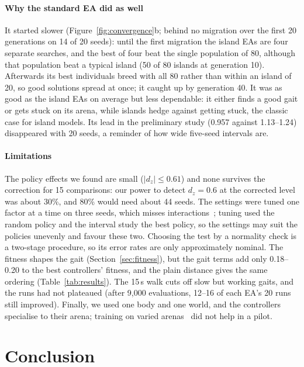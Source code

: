 \documentclass[sigconf]{acmart}
\begin{document}
\paragraph{Why the standard EA did as well} It started slower
(Figure~\ref{fig:convergence}b; behind no migration over the first 20
generations on 14 of 20 seeds): until the first migration the island EAs are
four separate searches, and the best of four beat the single population of
80, although that population beat a typical island (50 of 80 islands at
generation 10). Afterwards its best
individuals breed with all 80 rather than within an island of 20, so good
solutions spread at once; it caught up by generation 40. It was as good as
the island EAs on average but less dependable: it either finds a good gait or
gets stuck on its arena, while islands hedge against getting stuck, the
classic case for island models. Its lead in the preliminary study (0.957
against 1.13--1.24) disappeared with 20 seeds, a reminder of how wide
five-seed intervals are.

\paragraph{Limitations} The policy effects we found are small ($|d_z| \leq
0.61$) and none survives the correction for 15 comparisons: our power to
detect $d_z = 0.6$ at the corrected level was about 30\%, and 80\% would need
about 44 seeds. The settings were tuned one factor at
a time on three seeds, which misses interactions~\cite{eiben2011parameter};
tuning used the random policy and the interval study the best policy, so the
settings may suit the policies unevenly and favour these two. Choosing the test by a normality
check is a two-stage procedure, so its error rates are only approximately
nominal. The fitness shapes the gait
(Section~\ref{sec:fitness}), but the gait terms add only 0.18--0.20 to the
best controllers' fitness, and the plain distance gives the same ordering
(Table~\ref{tab:results}). The 15\,s walk cuts off slow but working gaits, and
the runs had not plateaued (after 9{,}000 evaluations, 12--16 of each EA's 20
runs still improved). Finally, we used one body and one
world, and the controllers specialise to their arena; training on varied
arenas~\cite{jakobi1997evolutionary} did not help in a pilot.

\section{Conclusion}
\end{document}
